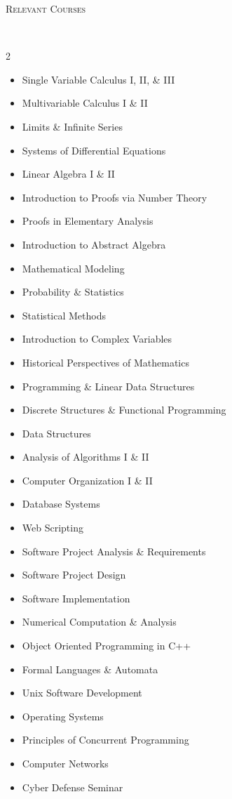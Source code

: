 \documentclass[9pt]{article}
\newenvironment{changemargin}[2]{%
  \begin{list}{}{%
    \setlength{\topsep}{0pt}%
    \setlength{\leftmargin}{#1}%
    \setlength{\rightmargin}{#2}%
    \setlength{\listparindent}{\parindent}%
    \setlength{\itemindent}{\parindent}%
    \setlength{\parsep}{\parskip}%
  }%
  \item[]}{\end{list}
}
\newcommand{\lineover}{
	\begin{changemargin}{-0.05in}{-0.05in}
		\vspace*{-8pt}
		\hrulefill \\
		\vspace*{-2pt}
	\end{changemargin}
}
\newcommand{\header}[1]{
	\begin{changemargin}{-0.5in}{-0.5in}
		\scshape{#1}\\
  		\lineover
	\end{changemargin}
}
\newenvironment{body} {
	\vspace*{-16pt}
	\begin{changemargin}{-0.20in}{-0.5in}
  }	
	{\end{changemargin}
}
\begin{document}
\header{Relevant Courses}
\begin{body}
	\vspace{4pt}
	\begin{multicols}{2}
		\begin{itemize} \itemsep -0pt
			\item [] Single Variable Calculus I, II, \& III
			\item [] Multivariable Calculus I \& II
			\item [] Limits \& Infinite Series
			\item [] Systems of Differential Equations
			\item [] Linear Algebra I \& II
			\item [] Introduction to Proofs via Number Theory
			\item [] Proofs in Elementary Analysis
			\item [] Introduction to Abstract Algebra
			\item [] Mathematical Modeling
			\item [] Probability \& Statistics
			\item [] Statistical Methods
			\item [] Introduction to Complex Variables
			\item [] Historical Perspectives of Mathematics
			
			\item [] Programming \& Linear Data Structures
			\item [] Discrete Structures \& Functional Programming
			\item [] Data Structures
			\item [] Analysis of Algorithms I \& II
			\item [] Computer Organization I \& II
			\item [] Database Systems
			\item [] Web Scripting
			\item [] Software Project Analysis \& Requirements
			\item [] Software Project Design
			\item [] Software Implementation
			\item [] Numerical Computation \& Analysis
			\item [] Object Oriented Programming in C++
			\item [] Formal Languages \& Automata
			\item [] Unix Software Development
			\item [] Operating Systems
			\item [] Principles of Concurrent Programming
			\item [] Computer Networks
			\item [] Cyber Defense Seminar
		\end{itemize}
	\end{multicols}
\end{body}
\end{document}
